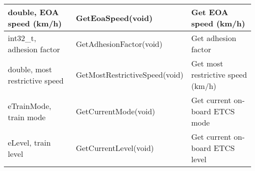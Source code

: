 \documentclass{template/openetcs_article}
\begin{document}
\begin{longtable}{|l|l|l|}
	\hline
		\begin{minipage}[t]{0.35\linewidth} double, EOA speed (km/h) \end{minipage} 
	&	\begin{minipage}[t]{0.35\linewidth} GetEoaSpeed(void) \end{minipage} 
	&	\begin{minipage}[t]{0.35\linewidth} Get EOA speed (km/h) \end{minipage} \\
	\hline
		\begin{minipage}[t]{0.35\linewidth} int32\_t, adhesion factor \end{minipage} 
	&	\begin{minipage}[t]{0.35\linewidth} GetAdhesionFactor(void) \end{minipage} 
	&	\begin{minipage}[t]{0.35\linewidth} Get adhesion factor \end{minipage} \\
	\hline
		\begin{minipage}[t]{0.35\linewidth} double, most restrictive speed\end{minipage} 
	&	\begin{minipage}[t]{0.35\linewidth} GetMostRestrictiveSpeed(void) \end{minipage} 
	&	\begin{minipage}[t]{0.35\linewidth}  Get most restrictive speed (km/h)\end{minipage} \\
	\hline
		\begin{minipage}[t]{0.35\linewidth} eTrainMode, train mode\end{minipage} 
	&	\begin{minipage}[t]{0.35\linewidth} GetCurrentMode(void) \end{minipage} 
	&	\begin{minipage}[t]{0.35\linewidth} Get current on-board ETCS mode \end{minipage} \\
	\hline
		\begin{minipage}[t]{0.35\linewidth} eLevel, train level	\end{minipage} 
	&	\begin{minipage}[t]{0.35\linewidth} GetCurrentLevel(void) \end{minipage} 
	&	\begin{minipage}[t]{0.35\linewidth} Get current on-board ETCS level \end{minipage} \\

\end{longtable}
\end{document}
